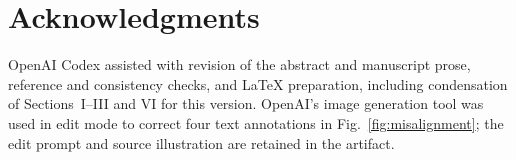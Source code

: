 \section*{Acknowledgments}
OpenAI Codex assisted with revision of the abstract and manuscript prose,
reference and consistency checks, and LaTeX preparation, including condensation
of Sections~I--III and VI for this version. OpenAI's image generation tool was
used in edit mode to correct four text annotations in Fig.~\ref{fig:misalignment};
the edit prompt and source illustration are retained in the artifact.
